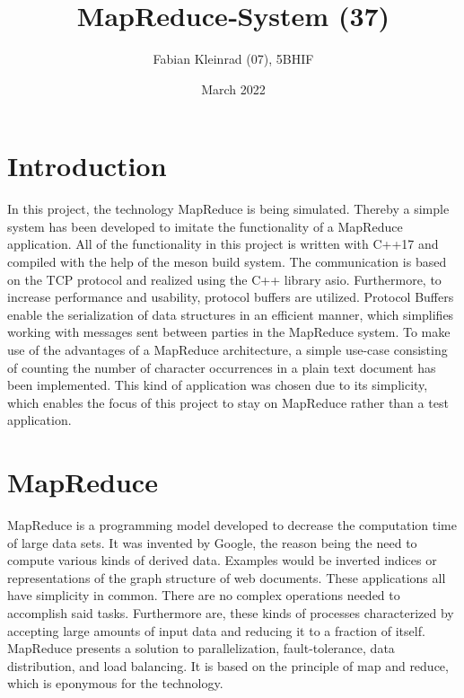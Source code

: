 \documentclass[12pt, letterpaper]{article}
\title{MapReduce‐System (37)}
\author{Fabian Kleinrad (07), 5BHIF}
\date{March 2022}
\begin{document}
\begin{titlepage}
\maketitle
\end{titlepage}

\tableofcontents
\newpage

\section{Introduction}

In this project, the technology MapReduce is being simulated. Thereby a simple system has been developed to imitate the functionality of a MapReduce application. All of the functionality in this project is written with C++17 and compiled with the help of the meson build system. The communication is based on the TCP protocol and realized using the C++ library asio.\newline
Furthermore, to increase performance and usability, protocol buffers are utilized. Protocol Buffers enable the serialization of data structures in an efficient manner, which simplifies working with messages sent between parties in the MapReduce system.\newline
To make use of the advantages of a MapReduce architecture, a simple use-case consisting of counting the number of character occurrences in a plain text document has been implemented. This kind of application was chosen due to its simplicity, which enables the focus of this project to stay on MapReduce rather than a test application. 

\section{MapReduce}

MapReduce is a programming model developed to decrease the computation time of large data sets. It was invented by Google, the reason being the need to compute various kinds of derived data. Examples would be inverted indices or representations of the graph structure of web documents. These applications all have simplicity in common. There are no complex operations needed to accomplish said tasks. Furthermore are, these kinds of processes characterized by accepting large amounts of input data and reducing it to a fraction of itself. MapReduce presents a solution to parallelization, fault-tolerance, data distribution, and load balancing. It is based on the principle of map and reduce, which is eponymous for the technology.
\end{document}
